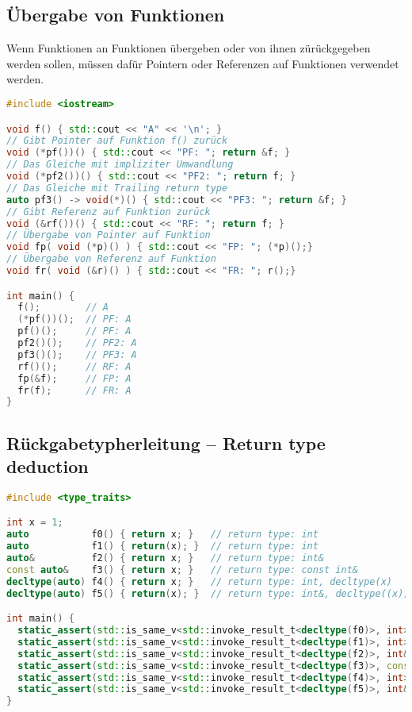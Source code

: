 \documentclass[10pt,twocolumn]{scrartcl}
\begin{document}
\subsection{Übergabe von Funktionen}

Wenn Funktionen an Funktionen übergeben oder von ihnen zürückgegeben werden
sollen, müssen dafür Pointern oder Referenzen auf Funktionen verwendet werden.

\begin{lstlisting}[language=C++]
#include <iostream>

void f() { std::cout << "A" << '\n'; }
// Gibt Pointer auf Funktion f() zurück
void (*pf())() { std::cout << "PF: "; return &f; }
// Das Gleiche mit impliziter Umwandlung
void (*pf2())() { std::cout << "PF2: "; return f; }
// Das Gleiche mit Trailing return type
auto pf3() -> void(*)() { std::cout << "PF3: "; return &f; }
// Gibt Referenz auf Funktion zurück
void (&rf())() { std::cout << "RF: "; return f; }
// Übergabe von Pointer auf Funktion
void fp( void (*p)() ) { std::cout << "FP: "; (*p)();}
// Übergabe von Referenz auf Funktion
void fr( void (&r)() ) { std::cout << "FR: "; r();}

int main() {
  f();        // A
  (*pf())();  // PF: A
  pf()();     // PF: A
  pf2()();    // PF2: A
  pf3()();    // PF3: A
  rf()();     // RF: A
  fp(&f);     // FP: A
  fr(f);      // FR: A
}
\end{lstlisting}

\subsection{Rückgabetypherleitung --  Return type deduction}

\begin{lstlisting}[basicstyle=\ttfamily\footnotesize,language=C++]
#include <type_traits>

int x = 1;
auto           f0() { return x; }   // return type: int
auto           f1() { return(x); }  // return type: int
auto&          f2() { return x; }   // return type: int&
const auto&    f3() { return x; }   // return type: const int&
decltype(auto) f4() { return x; }   // return type: int, decltype(x)
decltype(auto) f5() { return(x); }  // return type: int&, decltype((x))

int main() {
  static_assert(std::is_same_v<std::invoke_result_t<decltype(f0)>, int>);
  static_assert(std::is_same_v<std::invoke_result_t<decltype(f1)>, int>);
  static_assert(std::is_same_v<std::invoke_result_t<decltype(f2)>, int&>);
  static_assert(std::is_same_v<std::invoke_result_t<decltype(f3)>, const int&>);
  static_assert(std::is_same_v<std::invoke_result_t<decltype(f4)>, int>);
  static_assert(std::is_same_v<std::invoke_result_t<decltype(f5)>, int&>);
}
\end{lstlisting}
\end{document}
